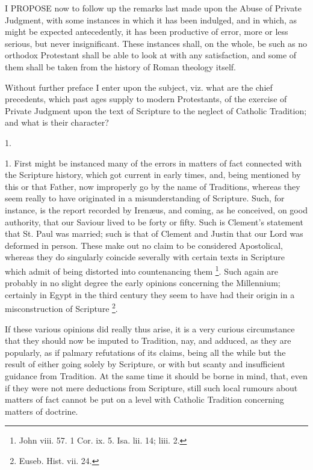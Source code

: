 
I PROPOSE now to follow up the remarks last made upon the
Abuse of Private Judgment, with some instances in which it has been
indulged, and in which, as might be expected antecedently, it has been
productive of error, more or less serious, but never insignificant.
These instances shall, on the whole, be such as no orthodox Protestant
shall be able to look at with any satisfaction, and some of them shall
be taken from the history of Roman theology itself.

Without further preface I enter upon the subject, viz. what are the
chief precedents, which past ages supply to modern Protestants, of the
exercise of Private Judgment upon the text of Scripture to the neglect
of Catholic Tradition; and what is their character?

1.

1. First might be instanced many of the errors in matters of fact
connected with the Scripture history, which got current in early
times, and, being mentioned by this or that Father, now improperly go
by the name of Traditions, whereas they seem really to have originated
in a misunderstanding of Scripture. Such, for instance, is the report
recorded by Irenæus, and coming, as he conceived, on good authority,
that our Saviour lived to be forty or fifty. Such is Clement's
statement that St. Paul was married; such is that of Clement and
Justin that our Lord was deformed in person. These make out no claim
to be considered Apostolical, whereas they do singularly coincide
severally with certain texts in Scripture which admit of being
distorted into countenancing them \footnote{John viii. 57. 1 Cor. ix. 5. Isa. lii. 14; liii. 2.}. Such again are probably in no slight degree the early opinions
concerning the Millennium; certainly in Egypt in the third century
they seem to have had their origin in a misconstruction of Scripture \footnote{Euseb. Hist. vii. 24.}.

If these various opinions did really thus arise, it is a very
curious circumstance that they should now be imputed to Tradition,
nay, and adduced, as they are popularly, as if palmary refutations of
its claims, being all the while but the result of either going solely
by Scripture, or with but scanty and insufficient guidance from
Tradition. At the same time it should be borne in mind, that, even if
they were not mere deductions from Scripture, still such local rumours
about matters of fact cannot be put on a level with Catholic Tradition
concerning matters of doctrine.

